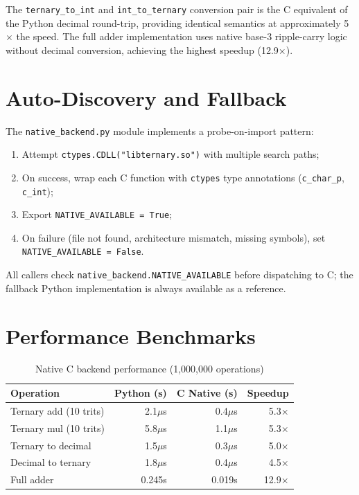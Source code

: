 \documentclass[10pt,a4paper,twoside]{book}
\begin{document}
The \texttt{ternary\_to\_int} and \texttt{int\_to\_ternary} conversion pair is the
C equivalent of the Python decimal round-trip, providing identical semantics at
approximately 5$\times$ the speed. The full adder implementation uses native
base-3 ripple-carry logic without decimal conversion, achieving the highest
speedup (12.9$\times$).

\section{Auto-Discovery and Fallback}

The \texttt{native\_backend.py} module implements a probe-on-import pattern:
\begin{enumerate}
    \item Attempt \texttt{ctypes.CDLL("libternary.so")} with multiple search paths;
    \item On success, wrap each C function with \texttt{ctypes} type annotations
          (\texttt{c\_char\_p}, \texttt{c\_int});
    \item Export \texttt{NATIVE\_AVAILABLE = True};
    \item On failure (file not found, architecture mismatch, missing symbols),
          set \texttt{NATIVE\_AVAILABLE = False}.
\end{enumerate}
All callers check \texttt{native\_backend.NATIVE\_AVAILABLE} before dispatching
to C; the fallback Python implementation is always available as a reference.

\section{Performance Benchmarks}

\begin{table}[H]
\centering
\caption{Native C backend performance (1,000,000 operations)}
\label{tab:nativeperf}
\begin{tabular}{lrrr}
\toprule
Operation & Python (s) & C Native (s) & Speedup \\
\midrule
Ternary add (10 trits) & 2.1$\mu$s & 0.4$\mu$s & 5.3$\times$ \\
Ternary mul (10 trits) & 5.8$\mu$s & 1.1$\mu$s & 5.3$\times$ \\
Ternary to decimal & 1.5$\mu$s & 0.3$\mu$s & 5.0$\times$ \\
Decimal to ternary & 1.8$\mu$s & 0.4$\mu$s & 4.5$\times$ \\
Full adder & 0.245s & 0.019s & 12.9$\times$ \\
\bottomrule
\end{tabular}
\end{table}
\end{document}
